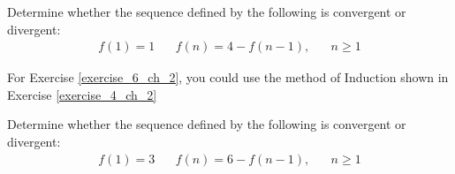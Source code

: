 \begin{exercise}\label{exercise_6_ch_2}
Determine whether the sequence defined by the following is convergent or divergent:
\begin{align*}
    f(1) = 1 \hspace{20pt} f(n) = 4 - f(n-1), \hspace{20pt} n \geq 1
\end{align*}
\end{exercise}

For Exercise \ref{exercise_6_ch_2}, you could use the method of Induction shown in Exercise \ref{exercise_4_ch_2}

\begin{exercise}
Determine whether the sequence defined by the following is convergent or divergent:
\begin{align*}
    f(1) = 3 \hspace{20pt} f(n) = 6 - f(n-1), \hspace{20pt} n \geq 1
\end{align*}
\end{exercise}



